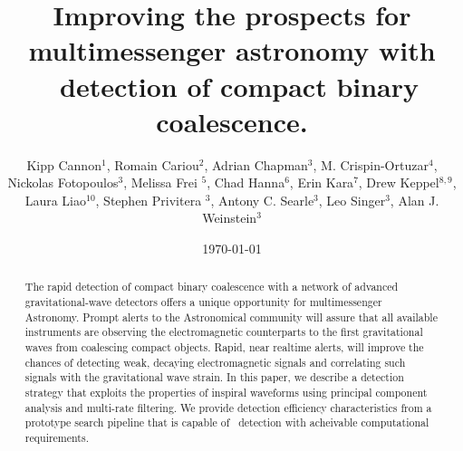 \documentclass[showpacs,groupedaddress,showkeys,preprintnumbers]{iopart}
\begin{document}
\title[LLOID]{Improving the prospects for multimessenger astronomy with
\earlywarning\ detection of compact binary coalescence.}

\date{\today}

\author{Kipp Cannon$^{1}$, Romain Cariou$^{2}$, Adrian Chapman$^3$, M.
Crispin-Ortuzar$^4$, Nickolas Fotopoulos$^3$, Melissa Frei $^5$, Chad
Hanna$^{6}$, Erin Kara$^{7}$, Drew Keppel$^{8,9}$, Laura Liao$^{10}$, Stephen
Privitera $^3$, Antony C.  Searle$^3$, Leo Singer$^3$, Alan J.  Weinstein$^3$}

\address{$^1$ Canadian Institute for Theoretical Astrophysics, Toronto, ON,
Canada}
\address{$^2$  Département de physique, École Normale Supérieure de Cachan, 61
Avenue du Président Wilson, 94235 Cachan Cedex, France}
\address{$^3$ LIGO Laboratory - California Institute of Technology, Pasadena,
CA, USA} 
\address{$^4$ Facultat de Física, Universitat de València, E-46100 Burjassot,
Spain} 
\address{$^5$ The University of Texas at Austin, Austin, TX, USA}
\address{$^6$ Perimeter Institute for Theoretical Physics, Waterloo, ON,
Canada} 
\address{$^7$ Department of Physics and Astronomy, Barnard College, Columbia
University, New York, NY 10027, USA} 
\address{$^8$ Albert-Einstein-Institut, Max-Planck-Institut f\"{u}r
Gravitationphysik, Hannover, Germany} 
\address{$^9$ Leibniz Universit\"{a}t Hannover, Hannover, Germany}
\address{$^{10}$ Ryerson University, Toronto, ON, Canada}

\begin{abstract}
The rapid detection of compact binary coalescence with a network of advanced
gravitational-wave detectors offers a unique opportunity for multimessenger
Astronomy.  Prompt alerts to the Astronomical community will assure that all
available instruments are observing the electromagnetic counterparts to the
first gravitational waves from coalescing compact objects.   Rapid, near
realtime alerts, will improve the chances of detecting weak, decaying
electromagnetic signals and correlating such signals with the gravitational
wave strain.  In this paper, we describe a detection strategy that exploits the
properties of inspiral waveforms using principal component analysis and
multi-rate filtering.  We provide detection efficiency characteristics from a
prototype search pipeline that is capable of \earlywarning\ detection with
acheivable computational requirements.  
\end{abstract}


\end{document}
